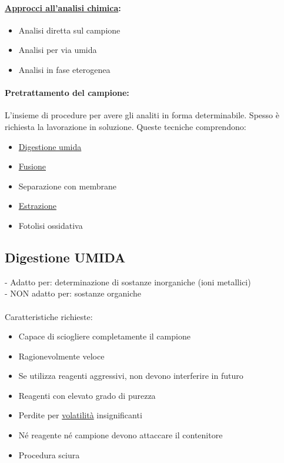\documentclass{article}
\begin{document}
\paragraph{\underline{Approcci all'analisi chimica}:} 

\begin{itemize}
	\item Analisi diretta sul campione
	\item Analisi per via umida
	\item Analisi in fase eterogenea
\end{itemize}

\paragraph{Pretrattamento del campione:} L'insieme di procedure per avere gli analiti in forma determinabile. Spesso è richiesta la lavorazione in soluzione. Queste tecniche comprendono:

\begin{itemize}
	\item \underline{Digestione umida}
	\item \underline{Fusione}
	\item Separazione con membrane
	\item \underline{Estrazione}
	\item Fotolisi ossidativa
\end{itemize}

\hrulefill

\subsection{Digestione UMIDA}

- Adatto per: determinazione di sostanze inorganiche (ioni metallici)
\\
- NON adatto per: sostanze organiche
\\\\
Caratteristiche richieste:
\begin{itemize}
	\item Capace di sciogliere completamente il campione
	\item Ragionevolmente veloce
	\item Se utilizza reagenti aggressivi, non devono interferire in futuro
	\item Reagenti con elevato grado di purezza
	\item Perdite per \underline{volatilità} insignificanti
	\item Né reagente né campione devono attaccare il contenitore
	\item Procedura sciura 
\end{itemize}
\end{document}
